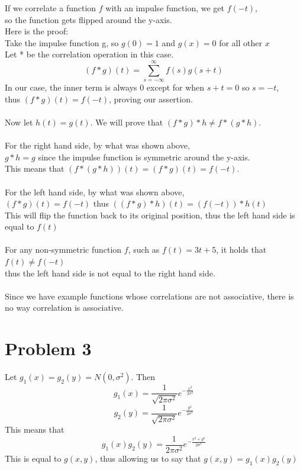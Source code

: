 \documentclass[11pt,psfig]{article}
\begin{document}
If we correlate a function $f$ with an impulse function, we get $f(-t)$, \\
so the function gets flipped around the y-axis. \\
Here is the proof:\\
Take the impulse function g, so $g(0)=1$ and $g(x)=0$ for all other $x$ \\
Let * be the correlation operation in this case. \\
\[
(f*g)(t) = \sum_{s=-\infty}^{\infty} f(s)g(s+t)
\]
In our case, the inner term is always $0$ except for when $s+t=0$ so $s=-t$, \\
thus $(f*g)(t)=f(-t)$, proving our assertion. \\
\\
Now let $h(t)=g(t)$. We will prove that $(f*g)*h \neq f*(g*h)$. \\
\\
For the right hand side, by what was shown above, \\
$g*h = g$ since the impulse function is symmetric around the y-axis. \\
This means that $(f*(g*h))(t) = (f*g)(t) = f(-t)$. \\
\\
For the left hand side, by what was shown above, \\
$(f*g)(t) = f(-t)$ thus $((f*g)*h)(t) = (f(-t))*h(t)$\\
This will flip the function back to its original position, thus the left hand side is equal to $f(t)$\\
\\
For any non-symmetric function $f$, such as $f(t) = 3t+5$, it holds that $f(t) \neq f(-t)$ \\
thus the left hand side is not equal to the right hand side. \\
\\
Since we have example functions whose correlations are not associative, there is no way correlation is associative. 

\newpage

\section*{Problem 3}

Let $g_1(x) = g_2(y) = N(0,\sigma^2)$. Then
\[
g_1(x) = \frac{1}{\sqrt{2\pi \sigma^2}} e^{-\frac{x^2}{2\sigma^2}}
\]
\[
g_2(y) = \frac{1}{\sqrt{2\pi \sigma^2}} e^{-\frac{y^2}{2\sigma^2}}
\]
This means that
\[
g_1(x)g_2(y) = \frac{1}{2\pi \sigma^2} e^{-\frac{x^2 + y^2}{2\sigma^2}}
\]
This is equal to $g(x,y)$, thus allowing us to say that $g(x,y) = g_1(x)g_2(y)$
\end{document}
